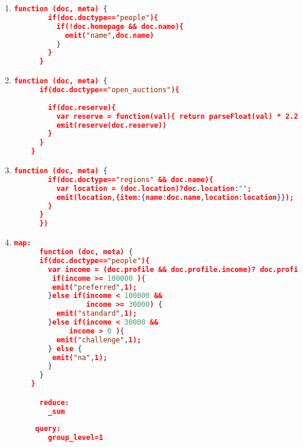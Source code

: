 \begin{enumerate}[label=Q\arabic*.]
    
    \item %
	\begin{lstlisting}[language=JSON, basicstyle=\scriptsize]
	  function (doc, meta) {
	    if(doc.doctype=="people"){
	      if(!doc.homepage && doc.name){
	        emit("name",doc.name)
	      } 
	    }
	  }
	\end{lstlisting}	

    \item %
	\begin{lstlisting}[language=JSON, basicstyle=\scriptsize]
	  function (doc, meta) {
      if(doc.doctype=="open_auctions"){
        
        if(doc.reserve){
          var reserve = function(val){ return parseFloat(val) * 2.20371 }
          emit(reserve(doc.reserve))
        } 
      }
    }
	\end{lstlisting}	

    \item %
	\begin{lstlisting}[language=JSON, basicstyle=\scriptsize]
	  function (doc, meta) {
	    if(doc.doctype=="regions" && doc.name){
	      var location = (doc.location)?doc.location:"";
	      emit(location,{item:{name:doc.name,location:location}});
	    }
	  }
	  })
	\end{lstlisting}	
    \item %
	\begin{lstlisting}[language=JSON, basicstyle=\scriptsize]
	  map:
	  function (doc, meta) {
      if(doc.doctype=="people"){ 
        var income = (doc.profile && doc.profile.income)? doc.profile.income : 0;
         if(income >= 100000 ){
      	 emit("preferred",1);
        }else if(income < 100000 && 
                 income >= 30000) {
          emit("standard",1);
        }else if(income < 30000 &&
             income > 0 ){
          emit("challenge",1);
        } else {
         emit("na",1);
        }    
      }
    }

	  reduce:
	    _sum
	 
	 query:
	    group_level=1
	\end{lstlisting}

\end{enumerate}
